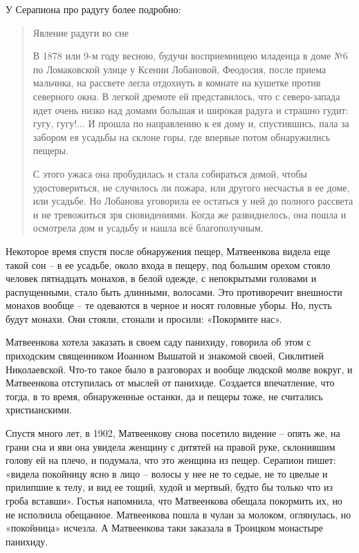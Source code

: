 У Серапиона про радугу более подробно:

\begin{quotation}
Явление радуги во сне

В 1878 или 9-м году весною, будучи восприемницею младенца в доме №6 по Ломаковской улице у Ксении Лобановой, Феодосия, после приема мальчика, на рассвете легла отдохнуть в комнате на кушетке против северного окна. В легкой дремоте ей представилось, что с северо-запада идет очень низко над домами большая и широкая радуга и страшно гудит: гугу, гугу!... И прошла по направлению к ея дому и, спустившись, пала за забором ея усадьбы на склоне горы, где впервые потом обнаружились пещеры.

С этого ужаса она пробудилась и стала собираться домой, чтобы удостовериться, не случилось ли пожара, или другого несчастья в ее доме, или усадьбе. Но Лобанова уговорила ее остаться у ней до полного рассвета и не тревожиться зря сновидениями. Когда же развиднелось, она пошла и осмотрела дом и усадьбу и нашла всё благополучным.
\end{quotation}

Некоторое время спустя после обнаружения пещер, Матвеенкова видела еще такой сон – в ее усадьбе, около входа в пещеру, под большим орехом стояло человек пятнадцать монахов, в белой одежде, с непокрытыми головами и распущенными, стало быть длинными, волосами. Это противоречит внешности монахов вообще – те одеваются в черное и носят головные уборы. Но, пусть будут монахи. Они стояли, стонали и просили: «Покормите нас».

Матвеенкова хотела заказать в своем саду панихиду, говорила об этом с приходским священником Иоанном Вышатой и знакомой своей, Сиклитией Николаевской. Что-то такое было в разговорах и вообще людской молве вокруг, и Матвеенкова отступилась от мыслей от панихиде. Создается впечатление, что тогда, в то время, обнаруженные останки, да и пещеры тоже, не считались христианскими.

Спустя много лет, в 1902, Матвеенкову снова посетило видение – опять же, на грани сна и яви она увидела женщину с дитятей на правой руке, склонившим голову ей на плечо, и подумала, что это женщина из пещер. Серапион пишет: «видела покойницу ясно в лицо – волосы у нее не то седые, не то цвелые и прилипшие к телу, и вид ее тощий, худой и мертвый, будто бы только что из гроба вставши». Гостья напомнила, что Матвеенкова обещала покормить их, но не исполнила обещанное. Матвеенкова пошла в чулан за молоком, оглянулась, но «покойница» исчезла. А Матвеенкова таки заказала в Троицком монастыре панихиду.

